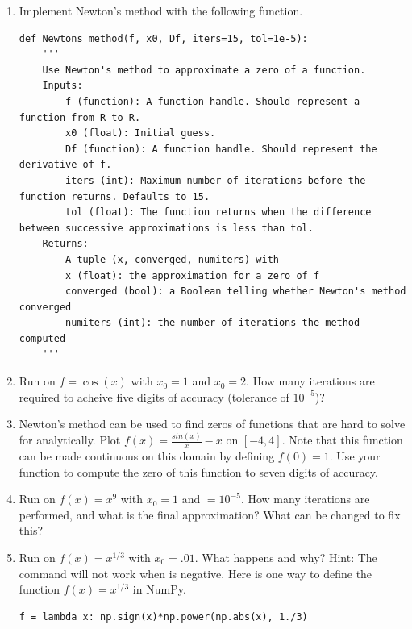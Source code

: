 \begin{problem}
\label{prob:newton_arr}
\leavevmode
\begin{enumerate}
\item Implement Newton's method with the following function.
\begin{lstlisting}
def Newtons_method(f, x0, Df, iters=15, tol=1e-5):
    '''
    Use Newton's method to approximate a zero of a function.
    Inputs:
        f (function): A function handle. Should represent a function from R to R.
        x0 (float): Initial guess.
        Df (function): A function handle. Should represent the derivative of f.
        iters (int): Maximum number of iterations before the function returns. Defaults to 15.
        tol (float): The function returns when the difference between successive approximations is less than tol.
    Returns:
        A tuple (x, converged, numiters) with
        x (float): the approximation for a zero of f
        converged (bool): a Boolean telling whether Newton's method converged
        numiters (int): the number of iterations the method computed
    '''
\end{lstlisting}

\item Run  on $f=\cos(x)$ with $x_0=1$ and $x_0=2$. 
How many iterations are required to acheive five digits of accuracy (tolerance of $10^{-5}$)?
\item Newton's method can be used to find zeros of functions that are hard to solve for analytically.
Plot $f(x) = \frac{sin(x)}{x}-x$ on $[-4, 4]$. 
Note that this function can be made continuous on this domain by defining $f(0)=1$. 
Use your function  to compute the zero of this function to seven digits of accuracy.
\item Run  on $f(x)=x^9$ with $x_0=1$ and $=10^{-5}$. 
How many iterations are performed, and what is the final approximation? 
What can be changed to fix this?
\item Run  on $f(x)=x^{1/3}$ with $x_0=.01$. 
What happens and why?
Hint: The command  will not work when  is negative. 
Here is one way to define the function $f(x)=x^{1/3}$ in NumPy.
\begin{lstlisting}
f = lambda x: np.sign(x)*np.power(np.abs(x), 1./3)
\end{lstlisting}
\end{enumerate}
\end{problem}


